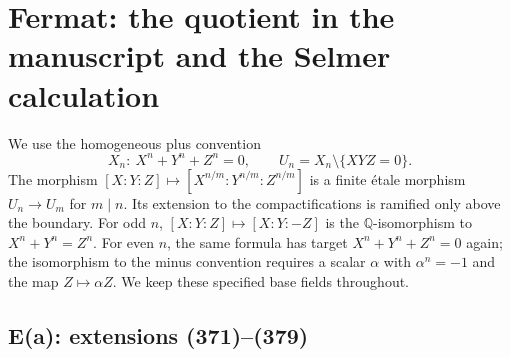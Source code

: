 \section{Fermat: the quotient in the manuscript and the Selmer calculation}
\label{sec:E}
We use the homogeneous plus convention
\[
 X_n:\ X^n+Y^n+Z^n=0,\qquad U_n=X_n\setminus\{XYZ=0\}.
\]
The morphism $[X:Y:Z]\mapsto[X^{n/m}:Y^{n/m}:Z^{n/m}]$
is a finite étale morphism $U_n\to U_m$ for $m\mid n$.
Its extension to the compactifications is ramified only above the
boundary. For odd $n$, $[X:Y:Z]\mapsto[X:Y:-Z]$ is the
$\mathbb Q$-isomorphism to $X^n+Y^n=Z^n$. For even $n$,
the same formula has target $X^n+Y^n+Z^n=0$ again; the
isomorphism to the minus convention requires a scalar
$\alpha$ with $\alpha^n=-1$ and the map $Z\mapsto\alpha Z$.
We keep these specified base fields throughout.

\subsection{E(a): extensions (371)--(379)}

